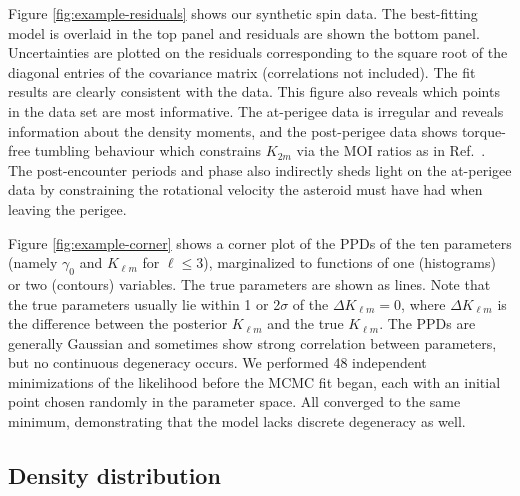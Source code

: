 \documentclass[fleqn,usenatbib]{mnras}
\begin{document}
Figure \ref{fig:example-residuals} shows our synthetic spin data. The best-fitting model is overlaid in the top panel and residuals are shown the bottom panel. Uncertainties are plotted on the residuals corresponding to the square root of the diagonal entries of the covariance matrix (correlations not included). The fit results are clearly consistent with the data. This figure also reveals which points in the data set are most informative. The at-perigee data is irregular and reveals information about the density moments, and the post-perigee data shows torque-free tumbling behaviour which constrains $K_{2m}$ via the MOI ratios as in Ref.~\cite{MOSKOVITZ2020113519}. The post-encounter periods and phase also indirectly sheds light on the at-perigee data by constraining the rotational velocity the asteroid must have had when leaving the perigee.

Figure \ref{fig:example-corner} shows a corner plot of the PPDs of the ten parameters (namely $\gamma_0$ and $K_{\ell m}$ for $\ell \leq 3$), marginalized to functions of one (histograms) or two (contours) variables. The true parameters are shown as lines. Note that the true parameters usually lie within 1 or 2$\sigma$ of the $\Delta K_{\ell m} = 0$, where $\Delta K_{\ell m}$ is the difference between the posterior $K_{\ell m}$ and the true $K_{\ell m}$. The PPDs are generally Gaussian and sometimes show strong correlation between parameters, but no continuous degeneracy occurs. We performed 48 independent minimizations of the likelihood before the MCMC fit began, each with an initial point chosen randomly in the parameter space. All converged to the same minimum, demonstrating that the model lacks discrete degeneracy as well.



\subsection{Density distribution}
\label{sec:asym-density}
\end{document}

